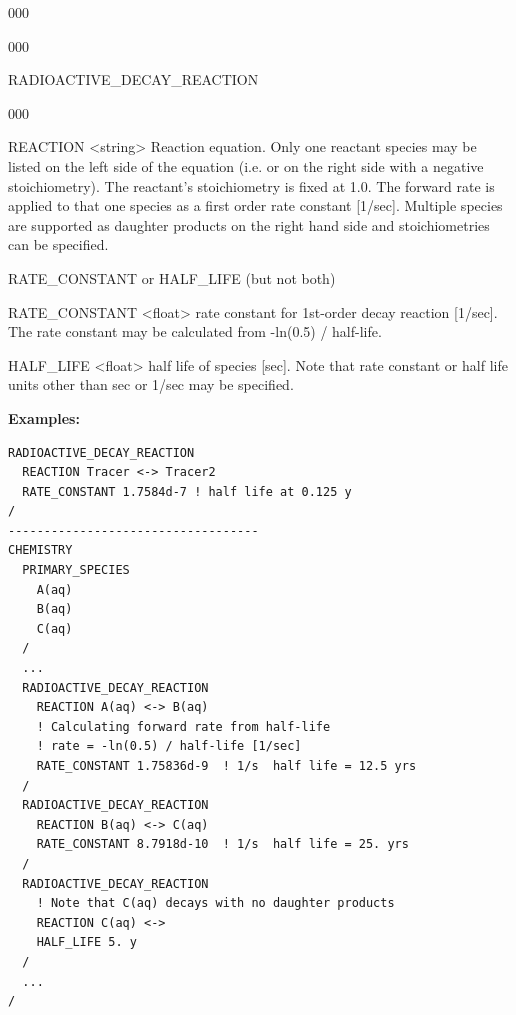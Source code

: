 \begin{deflist}{000}
\begin{deflist}{000}
\item[RADIOACTIVE\_DECAY\_REACTION] ~
\begin{deflist}{000}

\item [REACTION] <string>
Reaction equation. Only one reactant species may be listed on the left side of the equation (i.e. or on the right side with a negative stoichiometry). The reactant's stoichiometry is fixed at 1.0. The forward rate is applied to that one species as a first order rate constant [1/sec]. Multiple species are supported as daughter products on the right hand side and stoichiometries can be specified.

\item [RATE\_CONSTANT or HALF\_LIFE] (but not both)

\item [RATE\_CONSTANT] <float>
rate constant for 1st-order decay reaction [1/sec]. The rate constant may be calculated from -ln(0.5) / half-life.

\item [HALF\_LIFE] <float>
half life of species [sec].
Note that rate constant or half life units other than sec or 1/sec may be specified.
\end{deflist}

\item [\keyend]
\end{deflist}

\begin{mdframed}
{\bf Examples:}
\footnotesize
\begin{verbatim}
RADIOACTIVE_DECAY_REACTION
  REACTION Tracer <-> Tracer2
  RATE_CONSTANT 1.7584d-7 ! half life at 0.125 y
/
-----------------------------------
CHEMISTRY
  PRIMARY_SPECIES
    A(aq)
    B(aq)
    C(aq)
  /
  ...
  RADIOACTIVE_DECAY_REACTION
    REACTION A(aq) <-> B(aq)
    ! Calculating forward rate from half-life
    ! rate = -ln(0.5) / half-life [1/sec]
    RATE_CONSTANT 1.75836d-9  ! 1/s  half life = 12.5 yrs
  /
  RADIOACTIVE_DECAY_REACTION
    REACTION B(aq) <-> C(aq)
    RATE_CONSTANT 8.7918d-10  ! 1/s  half life = 25. yrs
  /
  RADIOACTIVE_DECAY_REACTION
    ! Note that C(aq) decays with no daughter products
    REACTION C(aq) <->
    HALF_LIFE 5. y
  /
  ...
/
\end{verbatim}
\normalsize
\end{mdframed}

\hfill\hyperlink{target_key}{\return}

\clearpage
\protect\hypertarget{target_chem_genrxn}{}


\end{deflist}
